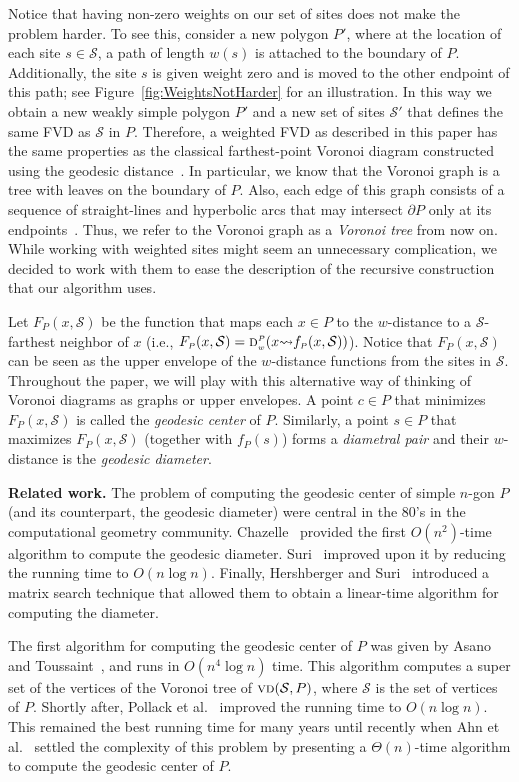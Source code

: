 \documentclass[a4paper, 11pt]{article}
\newcommand{\F}[2][P]{\ensuremath{F_{\scriptscriptstyle #1}(#2)}}
\newcommand{\s}{\mathcal S}
\newcommand{\dd}[3][P]{\ensuremath{\textsc{d}_{\scriptscriptstyle w}^{\scriptscriptstyle #1}(#2 {\leadsto} #3)}}
\newcommand{\f}[2][P]{\ensuremath{f_{\scriptscriptstyle #1}(#2)}}
\newcommand{\vd}[2][P]{\textsc{vd}(#2, #1)}
\begin{document}
Notice that having non-zero weights on our set of sites does not make the problem harder. 
To see this, consider a new polygon $P'$, where at the location of each site $s\in \s$, a path of length $w(s)$ is attached to the boundary of $P$. 
Additionally, the site $s$ is given weight zero and is moved to the other endpoint of this path; see Figure~\ref{fig:WeightsNotHarder} for an illustration. 
In this way we obtain a new weakly simple polygon $P'$ and a new set of sites $\s'$ that defines the same FVD as $\s$ in $P$. 
Therefore, a weighted FVD as described in this paper has the same properties as the classical farthest-point Voronoi diagram constructed using the geodesic distance~\cite{aronov1993furthest}. 
In particular, we know that the Voronoi graph is a tree with leaves on the boundary of $P$.
Also, each edge of this graph consists of a sequence of straight-lines and hyperbolic arcs that may intersect $\partial P$ only at its endpoints~\cite{aronov1993furthest}. 
Thus, we refer to the Voronoi graph as a \emph{Voronoi tree} from now on.
While working with weighted sites might seem an unnecessary complication, we decided to work with them to ease the description of the recursive construction that our algorithm uses. 

Let $\F{x, \s}$ be the function that maps each $x\in P$ to the $w$-distance to a $\s$-farthest neighbor of $x$ (i.e., $\F{x, \s} = \dd{x}{\f{x, \s}}$).
Notice that $\F{x, \s}$ can be seen as the upper envelope of the $w$-distance functions from the sites in $\s$.
Throughout the paper, we will play with this alternative way of thinking of Voronoi diagrams as graphs or upper envelopes.
A point $c\in P$ that minimizes $\F{x, \s}$ is called the \emph{geodesic center} of $P$. 
Similarly, a point $s\in P$ that maximizes $\F{x, \s}$ (together with $\f{s}$) forms a \emph{diametral pair} and their $w$-distance is the \emph{geodesic diameter}. 


\textbf{Related work.} 
The problem of computing the geodesic center of simple $n$-gon $P$ (and its counterpart, the geodesic diameter) were central in the 80's in the computational geometry community. 
Chazelle~\cite{c-tpca-82} provided the first $O(n^2)$-time algorithm to compute the geodesic diameter.
Suri~\cite{suri1989computing} improved upon it by reducing the running time to $O(n\log n)$. 
Finally, Hershberger and Suri~\cite{hershberger1993matrix} introduced a matrix search technique that allowed them to obtain a linear-time algorithm for computing the diameter.

The first algorithm for computing the geodesic center of $P$ was given by Asano and Toussaint~\cite{at-cgcsp-85}, and runs in $O(n^4\log n)$ time.  
This algorithm computes a super set of the vertices of the Voronoi tree of $\vd{\s}$, where $\s$ is the set of vertices of $P$.  
Shortly after, Pollack et al.~\cite{pollackComputingCenter} improved the running time to $O(n\log n)$.  
This remained the best running time for many years until recently when Ahn et al.~\cite{ahn2015linear} settled the complexity of this problem by presenting a $\Theta(n)$-time algorithm to compute the geodesic center of $P$. 
\end{document}

